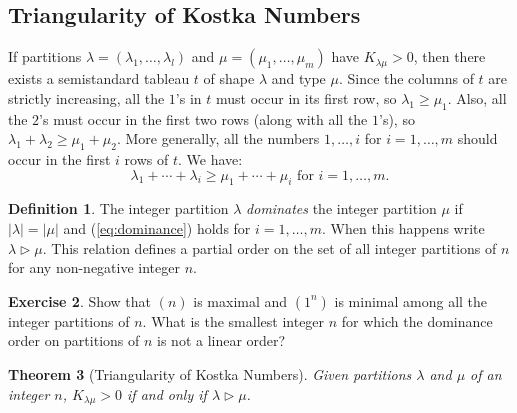 \documentclass[11pt]{amsproc}
\newtheorem{theorem}{Theorem}[subsection]
\theoremstyle{definition}
\newtheorem{definition}[theorem]{Definition}
\theoremstyle{example}
\newtheorem{exercise}[theorem]{Exercise}
\begin{document}
\subsection{Triangularity of Kostka Numbers}
\label{sec:triang-kostka-numb}
If partitions $\lambda=(\lambda_1,\dotsc,\lambda_l)$ and $\mu=(\mu_1,\dotsc,\mu_m)$ have $K_{\lambda\mu}>0$,
then there exists a semistandard tableau $t$ of shape $\lambda$ and type $\mu$.
Since the columns of $t$ are strictly increasing, all the $1$'s in $t$ must occur in its first row, so $\lambda_1\geq \mu_1$.
Also, all the $2$'s must occur in the first two rows (along with all the $1$'s), so $\lambda_1+\lambda_2\geq \mu_1+\mu_2$.
More generally, all the numbers $1,\dotsc, i$ for $i=1,\dotsc,m$ should occur in the first $i$ rows of $t$.
We have:
\begin{equation}
  \label{eq:dominance}
  \lambda_1+\dotsb + \lambda_i \geq \mu_1+\dotsb+\mu_i \text{ for } i=1,\dotsc, m.
\end{equation}
\begin{definition}
  The integer partition $\lambda$ \emph{dominates} the integer partition $\mu$ if $|\lambda|=|\mu|$ and (\ref{eq:dominance}) holds for $i=1,\dotsc,m$.
  When this happens write $\lambda\rhd \mu$.
  This relation defines a partial order on the set of all integer partitions of $n$ for any non-negative integer $n$.
\end{definition}
\begin{exercise}
  Show that $(n)$ is maximal and $(1^n)$ is minimal among all the integer partitions of $n$.
  What is the smallest integer $n$ for which the dominance order on partitions of $n$ is not a linear order?
\end{exercise}
\begin{theorem}
  [Triangularity of Kostka Numbers]
  \label{theorem:Kostka-triangularity}
  Given partitions $\lambda$ and $\mu$ of an integer $n$, $K_{\lambda\mu}>0$ if and only if $\lambda\rhd\mu$.
\end{theorem}
\end{document}
